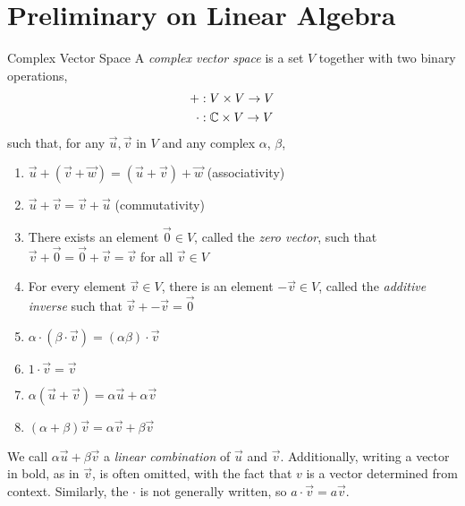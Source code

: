 \section{Preliminary on Linear Algebra}

\begin{definition}{Complex Vector Space}
    A \emph{complex vector space} is a set $V$ together with two binary operations,
    \begin{align*}
        +     & : V \times V \to V            \\
        \cdot & : \mathbb{C} \times V \to V
    \end{align*}
    such that, for any $\vec{u}, \vec{v}$ in $V$ and any complex $\alpha$,
    $\beta$,
    \begin{enumerate}[label=\arabic*)]
        \item $\vec{u} + (\vec{v} + \vec{w}) = (\vec{u} + \vec{v}) + \vec{w}$ (associativity)
        \item $\vec{u} + \vec{v} = \vec{v} + \vec{u}$ (commutativity)
        \item There exists an element $\vec{0} \in V$, called the \emph{zero vector}, such that $\vec{v} + \vec{0} = \vec{0} + \vec{v} = \vec{v}$ for all $\vec{v} \in V$
        \item For every element $\vec{v}\in V$, there is an element $-\vec{v} \in V$, called the \emph{additive inverse} such that
              $\vec{v} + -\vec{v} = \vec{0}$
        \item $\alpha\cdot(\beta\cdot\vec{v}) = (\alpha\beta)\cdot\vec{v}$
        \item $1\cdot\vec{v} = \vec{v}$
        \item $\alpha(\vec{u} + \vec{v}) = \alpha\vec{u} + \alpha\vec{v}$
        \item $(\alpha + \beta)\vec{v} = \alpha\vec{v} + \beta\vec{v}$
    \end{enumerate}
\end{definition}

We call $\alpha\vec{u} + \beta\vec{v}$ a \emph{linear combination} of $\vec{u}$
and $\vec{v}$. Additionally, writing a vector in bold, as in $\vec{v}$, is often
omitted, with the fact that $v$ is a vector determined from context. Similarly,
the $\cdot$ is not generally written, so $a\cdot\vec{v} = a\vec{v}$.

